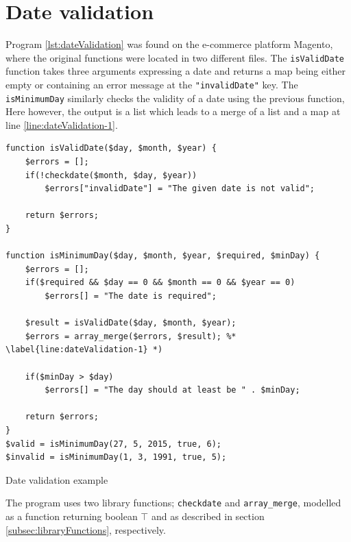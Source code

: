 \section{Date validation}
Program \ref{lst:dateValidation} was found on the e-commerce platform Magento, where the original functions were located in two different files. The \texttt{isValidDate} function takes three arguments expressing a date and returns a map being either empty or containing an error message at the \texttt{"invalidDate"} key.  The \texttt{isMinimumDay} similarly checks the validity of a date using the previous function, Here however, the output is a list which leads to a merge of a list and a map at line \ref{line:dateValidation-1}. 

\begin{program}
\begin{lstlisting}
function isValidDate($day, $month, $year) {
    $errors = [];
    if(!checkdate($month, $day, $year))
        $errors["invalidDate"] = "The given date is not valid";

    return $errors;
}

function isMinimumDay($day, $month, $year, $required, $minDay) {
    $errors = [];
    if($required && $day == 0 && $month == 0 && $year == 0)
        $errors[] = "The date is required";

    $result = isValidDate($day, $month, $year);
    $errors = array_merge($errors, $result); %* \label{line:dateValidation-1} *)

    if($minDay > $day)
        $errors[] = "The day should at least be " . $minDay;

    return $errors;
}
$valid = isMinimumDay(27, 5, 2015, true, 6);
$invalid = isMinimumDay(1, 3, 1991, true, 5);
\end{lstlisting}
\caption{Date validation example}
\label{lst:dateValidation}
\end{program}

The program uses two library functions; \texttt{checkdate} and \texttt{array\_merge}, modelled as a function returning boolean $\top$ and as described in section \ref{subsec:libraryFunctions}, respectively.





